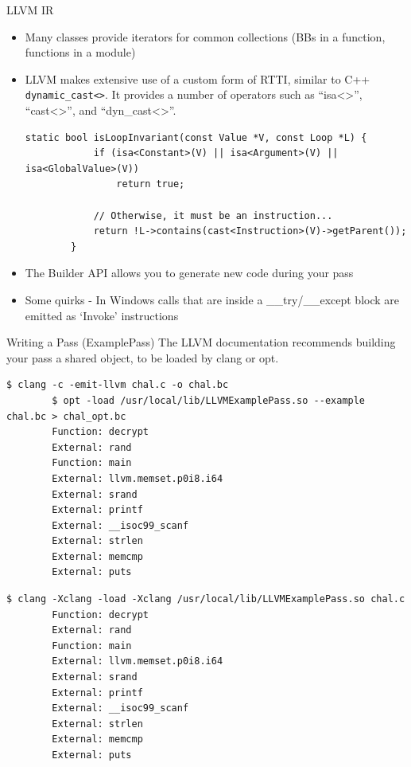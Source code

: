 \documentclass{beamer}
\begin{document}
\begin{frame}[fragile]{LLVM IR}
    \begin{itemize}
        \item Many classes provide iterators for common collections (BBs in a function, functions in a module)
        \item LLVM makes extensive use of a custom form of RTTI, similar to C++ \texttt{dynamic\_cast<>}. It provides a number of operators such as ``isa<>'', ``cast<>'', and ``dyn\_cast<>''.

        \begin{lstlisting}[basicstyle=\scriptsize,gobble=8,escapeinside=~]
        static bool isLoopInvariant(const Value *V, const Loop *L) {
            if (isa<Constant>(V) || isa<Argument>(V) || isa<GlobalValue>(V))
                return true;

            // Otherwise, it must be an instruction...
            return !L->contains(cast<Instruction>(V)->getParent());
        }
        \end{lstlisting}

        \item The Builder API allows you to generate new code during your pass
        \item Some quirks - In Windows calls that are inside a \_\_try/\_\_except block are emitted as `Invoke' instructions
    \end{itemize}
\end{frame}


\begin{frame}[fragile]{Writing a Pass (ExamplePass)}
    The LLVM documentation recommends building your pass a shared object, to be loaded by clang or opt.

    \begin{overprint}
        \begin{lstlisting}[basicstyle=\scriptsize,gobble=8]
        $ clang -c -emit-llvm chal.c -o chal.bc
        $ opt -load /usr/local/lib/LLVMExamplePass.so --example chal.bc > chal_opt.bc
        Function: decrypt
        External: rand
        Function: main
        External: llvm.memset.p0i8.i64
        External: srand
        External: printf
        External: __isoc99_scanf
        External: strlen
        External: memcmp
        External: puts
        \end{lstlisting}

        \begin{lstlisting}[basicstyle=\scriptsize,gobble=8]
        $ clang -Xclang -load -Xclang /usr/local/lib/LLVMExamplePass.so chal.c
        Function: decrypt
        External: rand
        Function: main
        External: llvm.memset.p0i8.i64
        External: srand
        External: printf
        External: __isoc99_scanf
        External: strlen
        External: memcmp
        External: puts
        \end{lstlisting}
    \end{overprint}
\end{frame}
\end{document}
